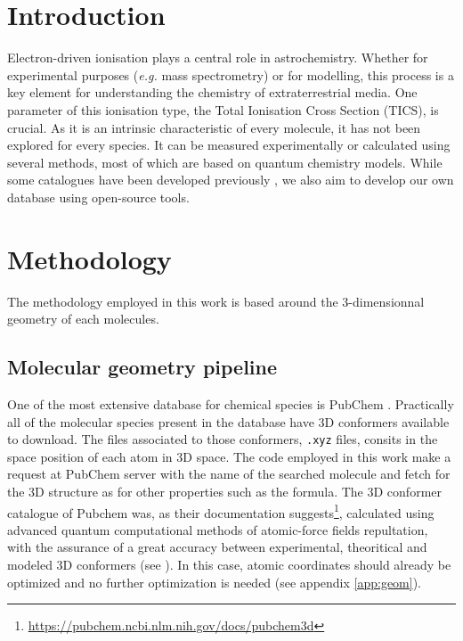 \documentclass[article,preview]{planetary}
\begin{document}
\license{}

\newpage

\section*{Introduction}
Electron-driven ionisation plays a central role in astrochemistry. Whether for experimental purposes (\textit{e.g.} mass spectrometry) or for modelling, this process is a key element for understanding the chemistry of extraterrestrial media. One parameter of this ionisation type, the Total Ionisation Cross Section (TICS), is crucial. As it is an intrinsic characteristic of every molecule, it has not been explored for every species. It can be measured experimentally or calculated using several methods, most of which are based on quantum chemistry models. While some catalogues have been developed previously \parencite{gachesAstrochemistryLowenergyElectron2024,linstromNISTChemistryWebBook2001}, we also aim to develop our own database using open-source tools.

\section{Methodology}

The methodology employed in this work is based around the 3-dimensionnal geometry of each molecules.

\subsection{Molecular geometry pipeline} 
One of the most extensive database for chemical species is PubChem \parencites{kimPubChem2025Update2025}. Practically all of the molecular species present in the database have 3D conformers available to download. The files associated to those conformers, \verb|.xyz| files, consits in the space position of each atom in 3D space. The code employed in this work make a request at PubChem server with the name of the searched molecule and fetch for the 3D structure as for other properties such as the formula. The 3D conformer catalogue of Pubchem was, as their documentation suggests\footnote{\url{https://pubchem.ncbi.nlm.nih.gov/docs/pubchem3d}}, calculated using advanced quantum computational methods of atomic-force fields repultation, with the assurance of a great accuracy between experimental, theoritical and modeled 3D conformers (see \cite{boltonPubChem3DConformerGeneration2011}). In this case, atomic coordinates should already be optimized and no further optimization is needed (see appendix \ref{app:geom}).
\end{document}
